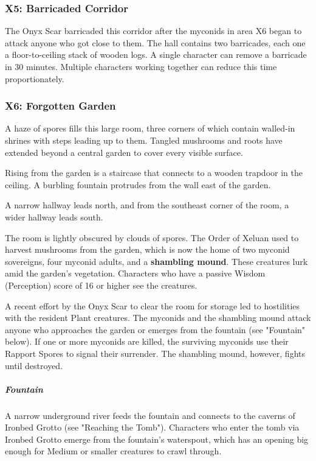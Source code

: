 \documentclass[10pt,a4paper,twoside,bg=print,twocolumn,openany,nodeprecatedcode]{dndbook}
\begin{document}
\subsubsection{X5: Barricaded Corridor}
The Onyx Scar barricaded this corridor after the myconids in area X6 began to attack anyone who got close to them. The hall contains two barricades, each one a floor-to-ceiling stack of wooden logs. A single character can remove a barricade in 30 minutes. Multiple characters working together can reduce this time proportionately.

\subsubsection{X6: Forgotten Garden}
\begin{DndReadAloud}{}
A haze of spores fills this large room, three corners of which contain walled-in shrines with steps leading up to them. Tangled mushrooms and roots have extended beyond a central garden to cover every visible surface.

Rising from the garden is a staircase that connects to a wooden trapdoor in the ceiling. A burbling fountain protrudes from the wall east of the garden.

A narrow hallway leads north, and from the southeast corner of the room, a wider hallway leads south.

\end{DndReadAloud}

The room is lightly obscured by clouds of spores. The Order of Xeluan used to harvest mushrooms from the garden, which is now the home of two myconid sovereigns, four myconid adults, and a \textbf{shambling mound}. These creatures lurk amid the garden's vegetation. Characters who have a passive Wisdom (Perception) score of 16 or higher see the creatures.

A recent effort by the Onyx Scar to clear the room for storage led to hostilities with the resident Plant creatures. The myconids and the shambling mound attack anyone who approaches the garden or emerges from the fountain (see "Fountain" below). If one or more myconids are killed, the surviving myconids use their Rapport Spores to signal their surrender. The shambling mound, however, fights until destroyed.

\subparagraph{Fountain}
A narrow underground river feeds the fountain and connects to the caverns of Ironbed Grotto (see "Reaching the Tomb"). Characters who enter the tomb via Ironbed Grotto emerge from the fountain's waterspout, which has an opening big enough for Medium or smaller creatures to crawl through.
\end{document}
